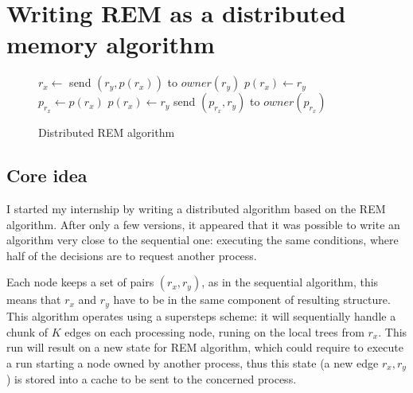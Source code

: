\documentclass[12px]{article}
\begin{document}
  \section{Writing REM as a distributed memory algorithm}
    \begin{wrapfigure}{r}{6.5cm}
      \centering
      \begin{minipage}{\linewidth}
        \begin{algorithm}[H]
          \caption{Distributed REM algorithm}%
          \label{alg:rem_distributed}
          \begin{algorithmic}[1]
              \State $r_x \gets$ 
              \State
                \State send $(r_y, p(r_x))$ to $owner(r_y)$
                  \State $p(r_x) \gets r_y$
                \Else
                  \State $p_{r_x} \gets p(r_x)$
                  \State $p(r_x) \gets r_y$
                  \State send $(p_{r_x}, r_y)$ to $owner(p_{r_x})$
                \EndIf
              \EndIf
            \EndFunction
         \end{algorithmic}
        \end{algorithm}
      \end{minipage}
    \end{wrapfigure}

    \subsection{Core idea}
      I started my internship by writing a distributed algorithm based on the REM algorithm. After only a few versions, it appeared that it was possible to write an algorithm very close to the sequential one: executing the same conditions, where half of the decisions are to request another process.

      Each node keeps a set of pairs $(r_x, r_y)$, as in the sequential algorithm, this means that $r_x$ and $r_y$ have to be in the same component of resulting structure.
      This algorithm operates using a supersteps scheme: it will sequentially handle a chunk of $K$ edges on each processing node, runing on the local trees from $r_x$.
      This run will result on a new state for REM algorithm, which could require to execute a run starting a node owned by another process, thus this state (a new edge $r_x, r_y$) is stored into a cache to be sent to the concerned process.
\end{document}
